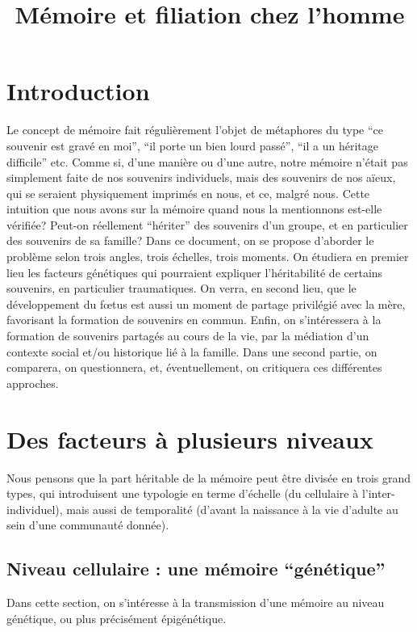 \documentclass[french]{article}
\title{Mémoire et filiation chez l'homme}
\begin{document}
	\maketitle
	\section*{Introduction}
		Le concept de mémoire fait régulièrement l'objet de métaphores du type ``ce souvenir est gravé en moi'', ``il porte un bien lourd passé'', ``il a un héritage difficile'' etc. Comme si, d'une manière ou d'une autre, notre mémoire n'était pas simplement faite de nos souvenirs individuels, mais des souvenirs de nos aïeux, qui se seraient physiquement imprimés en nous, et ce, malgré nous. Cette intuition que nous avons sur la mémoire quand nous la mentionnons est-elle vérifiée? Peut-on réellement ``hériter'' des souvenirs d'un groupe, et en particulier des souvenirs de sa famille? Dans ce document, on se propose d'aborder le problème selon trois angles, trois échelles, trois moments. On étudiera en premier lieu les facteurs génétiques qui pourraient expliquer l'héritabilité de certains souvenirs, en particulier traumatiques. On verra, en second lieu, que le développement du fœtus est aussi un moment de partage privilégié avec la mère, favorisant la formation de souvenirs en commun. Enfin, on s'intéressera à la formation de souvenirs partagés au cours de la vie, par la médiation d'un contexte social et/ou historique lié à la famille. Dans une second partie, on comparera, on questionnera, et, éventuellement, on critiquera ces différentes approches.
	\section{Des facteurs à plusieurs niveaux}
		Nous pensons que la part héritable de la mémoire peut être divisée en trois grand types, qui introduisent une typologie en terme d'échelle (du cellulaire à l'inter-individuel), mais aussi de temporalité (d'avant la naissance à la vie d'adulte au sein d'une communauté donnée). 
		\subsection{Niveau cellulaire : une mémoire ``génétique''}
			Dans cette section, on s'intéresse à la transmission d'une mémoire au niveau génétique, ou plus précisément épigénétique.
\end{document}
